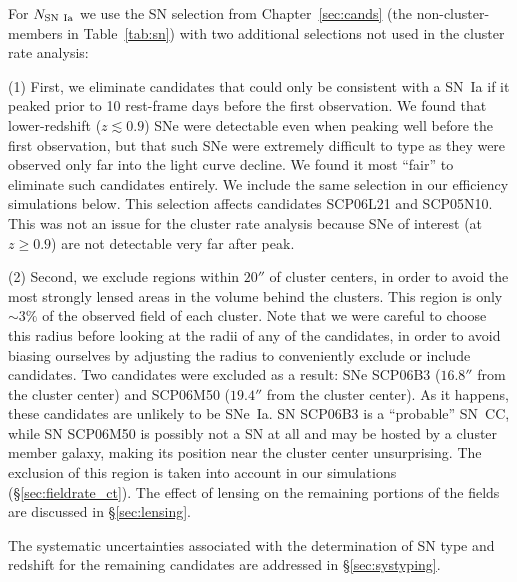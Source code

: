 

For $N_{\rm SN~Ia}$ we use the SN selection from
Chapter~\ref{sec:cands} (the non-cluster-members in
Table~\ref{tab:sn}) with two additional selections not used in the
cluster rate analysis:

(1) First, we eliminate candidates that could only be consistent with
a SN~Ia if it peaked prior to 10 rest-frame days before the first
observation. We found that lower-redshift ($z \lesssim 0.9$) SNe were
detectable even when peaking well before the first observation, but
that such SNe were extremely difficult to type as they were observed
only far into the light curve decline. We found it most ``fair'' to
eliminate such candidates entirely. We include the same selection in
our efficiency simulations below. This selection affects candidates
SCP06L21 and SCP05N10. This was not an issue for the cluster rate
analysis because SNe of interest (at $z \ge 0.9$) are not detectable
very far after peak.

(2) Second, we exclude regions within $20''$ of cluster centers, in
order to avoid the most strongly lensed areas in the volume behind the
clusters. This region is only $\sim$$3\%$ of the observed field of
each cluster. Note that we were careful to choose this radius before
looking at the radii of any of the candidates, in order to avoid
biasing ourselves by adjusting the radius to conveniently exclude or
include candidates. Two candidates were excluded as a result: SNe
SCP06B3 ($16.8''$ from the cluster center) and SCP06M50 ($19.4''$ from
the cluster center). As it happens, these candidates are unlikely to
be SNe~Ia. SN SCP06B3 is a ``probable'' SN~CC, while SN SCP06M50 is
possibly not a SN at all and may be hosted by a cluster member galaxy,
making its position near the cluster center unsurprising.  The
exclusion of this region is taken into account in our simulations
(\S\ref{sec:fieldrate_ct}). The effect of lensing on the remaining
portions of the fields are discussed in \S\ref{sec:lensing}.

The systematic uncertainties associated with the determination of SN
type and redshift for the remaining candidates are addressed
in \S\ref{sec:systyping}.

